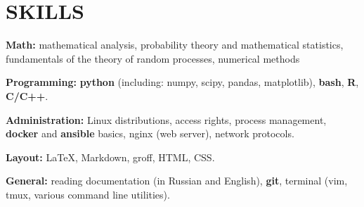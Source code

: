 \section{SKILLS}

\begin{description}

    \setlength\itemsep{-0.4em}

    \item{\bfseries Math:}
        mathematical analysis, probability theory and mathematical statistics, fundamentals of the theory of random processes, numerical methods

    \item{\bfseries Programming:}
        \textbf{python} (including: numpy, scipy, pandas, matplotlib), \textbf{bash}, \textbf{R}, \textbf{C/C++}.

    \item{\bfseries Administration:}
        Linux distributions, access rights, process management, \textbf{docker}
        and \textbf{ansible} basics, nginx (web server), network protocols.

    \item{\bfseries Layout:}
    \LaTeX, Markdown, groff, HTML, CSS.

    \item{\bfseries General:}
        reading documentation (in Russian and English), \textbf{git}, terminal (vim,
        tmux, various command line utilities).

\end{description}
    
    \vspace{.7em}
